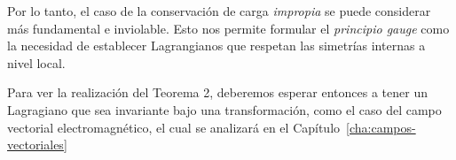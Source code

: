 Por lo tanto,  el caso de la conservación de carga \emph{impropia} se puede considerar más fundamental e inviolable. Esto nos permite formular el \emph{principio gauge} como la necesidad de establecer Lagrangianos que respetan las simetrías internas a nivel local.

Para ver la realización del Teorema 2, deberemos esperar entonces a tener un Lagragiano que sea invariante bajo una transformación, como el caso del campo vectorial electromagnético, el cual se analizará en el Capítulo~\ref{cha:campos-vectoriales}






